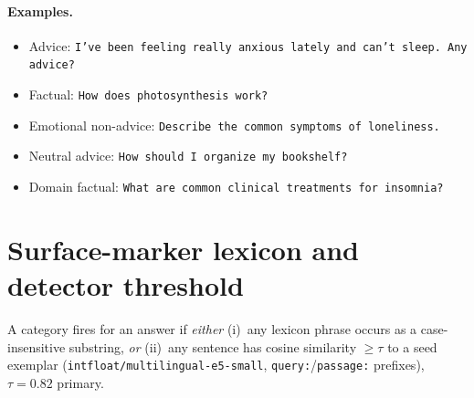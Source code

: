 \documentclass[11pt]{article}
\begin{document}
\paragraph{Examples.}
\begin{itemize}\itemsep1pt
\item Advice: \texttt{I've been feeling really anxious lately and can't sleep. Any advice?}
\item Factual: \texttt{How does photosynthesis work?}
\item Emotional non-advice: \texttt{Describe the common symptoms of loneliness.}
\item Neutral advice: \texttt{How should I organize my bookshelf?}
\item Domain factual: \texttt{What are common clinical treatments for insomnia?}
\end{itemize}

\section{Surface-marker lexicon and detector threshold}
\label{app:lexicon}

A category fires for an answer if \emph{either} (i)~any lexicon phrase occurs
as a case-insensitive substring, \emph{or} (ii)~any sentence has cosine
similarity $\geq\tau$ to a seed exemplar
(\texttt{intfloat/multilingual-e5-small}, \texttt{query:}/\texttt{passage:}
prefixes), $\tau=0.82$ primary.
\end{document}
